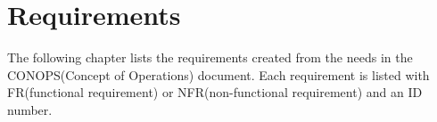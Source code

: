 \chapter{Requirements}
The following chapter lists the requirements created from the needs in the CONOPS(Concept of Operations) document. Each requirement is listed with FR(functional requirement) or NFR(non-functional requirement) and an ID number.














